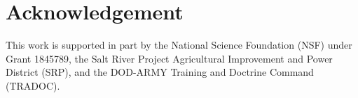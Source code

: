 \section{Acknowledgement}
This work is supported in part by the National Science Foundation (NSF) under Grant 1845789, the Salt River Project Agricultural Improvement and Power District (SRP), and the DOD-ARMY Training and Doctrine Command (TRADOC).